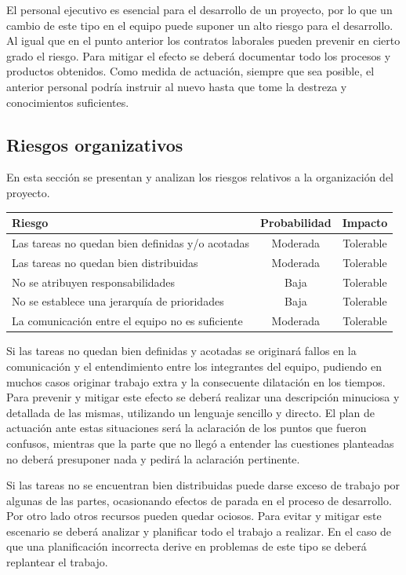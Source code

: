 El personal ejecutivo es esencial para el desarrollo de un proyecto, por lo que un cambio de este tipo en el equipo puede suponer un alto riesgo 
para el desarrollo. Al igual que en el punto anterior los contratos laborales pueden prevenir en cierto grado el riesgo. Para mitigar el efecto se 
deberá documentar todo los procesos y productos obtenidos. Como medida de actuación, siempre que sea posible, el anterior personal podría instruir al
nuevo hasta que tome la destreza y conocimientos suficientes.

\subsection{Riesgos organizativos}

En esta sección se presentan y analizan los riesgos relativos a la organización del proyecto. 

\begin{tabular}{|l|c|c|} \hline
\textbf{Riesgo} & \textbf{Probabilidad} & \textbf{Impacto} \\ \hline
Las tareas no quedan bien definidas y/o acotadas & Moderada & Tolerable \\ \hline
Las tareas no quedan bien distribuidas & Moderada & Tolerable \\ \hline
No se atribuyen responsabilidades & Baja & Tolerable \\ \hline
No se establece una jerarquía de prioridades & Baja & Tolerable \\ \hline
La comunicación entre el equipo no es suficiente & Moderada & Tolerable \\ \hline
\end{tabular}

Si las tareas no quedan bien definidas y acotadas se originará fallos en la comunicación y el entendimiento entre
los integrantes del equipo, pudiendo en muchos casos originar trabajo extra y la consecuente dilatación en los tiempos. 
Para prevenir y mitigar este efecto se deberá realizar una descripción minuciosa y detallada de las mismas, utilizando un lenguaje 
sencillo y directo. El plan de actuación ante estas situaciones será la aclaración de los puntos que fueron confusos, mientras que la parte 
que no llegó a entender las cuestiones planteadas no deberá presuponer nada y pedirá la aclaración pertinente. 

Si las tareas no se encuentran bien distribuidas puede darse exceso de trabajo por algunas de las partes, ocasionando efectos de parada en el 
proceso de desarrollo. Por otro lado otros recursos pueden quedar ociosos. Para evitar y mitigar este escenario se deberá analizar y planificar todo 
el trabajo a realizar. En el caso de que una planificación incorrecta derive en problemas de este tipo se deberá replantear el trabajo.

